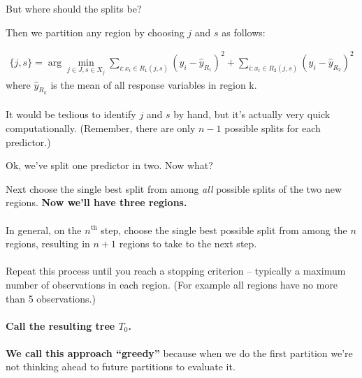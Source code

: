 \documentclass[mathserif, aspectratio=169]{beamer}
\begin{document}
\begin{frame}{But where should the splits be?}

Then we partition any region by choosing $j$ and $s$ as follows:

\begin{align*}
\{j,s\} = \arg \min_{j\in J, s\in X_j} \sum_{i:x_i\in R_1(j,s)} (y_i-\hat{y}_{R_1})^2 + \sum_{i:x_i\in R_2(j,s)} (y_i-\hat{y}_{R_2})^2
\end{align*}
where $\hat{y}_{R_k}$ is the mean of all response variables in region k.  \\~\\

It would be tedious to identify $j$ and $s$ by hand, but it's actually very quick computationally.  (Remember, there are only $n-1$ possible splits for each predictor.)
\end{frame}

\begin{frame}{Ok, we've split one predictor in two.  Now what?}

Next choose the single best split from among \textit{all} possible splits of the two new regions. \textbf{Now we'll have three regions.}\\~\\

In general, on the $n^\text{th}$ step, choose the single best possible split from among the $n$ regions, resulting in $n+1$ regions to take to the next step. \\~\\

Repeat this process until you reach a stopping criterion -- typically a maximum number of observations in each region. (For example all regions have no more than 5 observations.) \\~\\ \textbf{Call the resulting tree $T_0$.} \\~\\

\textbf{We call this approach ``greedy''} because when we do the first partition we're not thinking ahead to future partitions to evaluate it.  
\end{frame}
\end{document}
